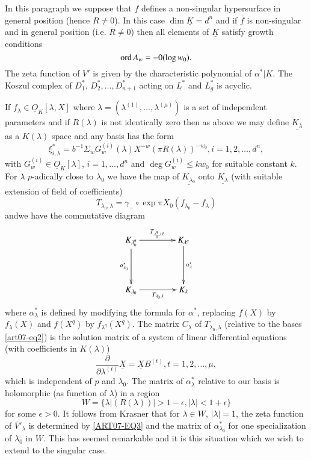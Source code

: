 In this paragraph we suppose that $f$ defines a non-singular hypersurface in general position (hence $R\neq 0$). In this case $\dim \underline{K}=d^{n}$ and if $\overline{f}$ is non-singular and in general position (i.e. $\overline{R}\neq 0$) then all elements of $\underline{K}$ satisfy growth conditions 
\begin{equation}
\operatorname{\mathrm{ord}} A_{w}=-0(\log w_{0}).\label{art07-eq1}
\end{equation}
The zeta function of $\overline{V'}$ is given by the characteristic polynomial of $\alpha^{*}|\underline{K}$. The Koszul complex of $D^{*}_{1}$, $D^{*}_{2},\ldots,D^{*}_{n+1}$ acting on $\underline{L^{*}}$ and $L^{*}_{g}$ is acyclic.

If $f_{\lambda}\in \underline{O}_{K}[\lambda,X]$ where $\lambda=(\lambda^{(1)},\ldots,\lambda^{(\mu)})$ is a set of independent parameters and if $R(\lambda)$ is not identically zero then as above we may define $\underline{K_{\lambda}}$ as a $K(\lambda)$ space and any basis has the form
\begin{equation}
\xi^{*}_{i,\lambda}=b^{-1}\Sigma_{w}G^{(i)}_{w}(\lambda)X^{-w}(\pi R(\lambda))^{-w_{0}}, i=1,2,\ldots,d^{n},\label{art07-eq2}
\end{equation}
with $G^{(i)}_{w}\in \underline{O}_{K}[\lambda]$, $i=1,\ldots,d^{n}$ and $\deg G^{(i)}_{w}\leq kw_{0}$ for suitable constant $k$. For $\lambda$ $p$-adically close to $\lambda_{0}$ we have the map of $\underline{K_{\lambda_{0}}}$ onto $\underline{K_{\lambda}}$ (with suitable extension of field of coefficients)
$$
T_{\lambda_{0},\lambda}=\gamma_{-}\circ \exp \pi X_{0}(f_{\lambda_{0}}-f_{\lambda})
$$
and\pageoriginale we have the commutative diagram
\[
\xymatrix@=1.5cm{
K_{\lambda^{q}_{0}}\ar[r]^-{T_{\lambda^{q}_{0},\lambda^{q}}}\ar[d]_-{\alpha^{*}_{\lambda_{0}}} & K_{\lambda^{q}}\ar[d]^-{\alpha^{*}_{\lambda}} \\
K_{\lambda_{0}}\ar[r]_-{T_{\lambda_{0},\lambda}} & K_{\lambda}
}
\]
where $\alpha^{*}_{\lambda}$ is defined by modifying the formula for $\alpha^{*}$, replacing $f(X)$ by $f_{\lambda}(X)$ and $f(X^{q})$ by $f_{\lambda^{q}}(X^{q})$. The matrix $C_{\lambda}$ of $T_{\lambda_{0},\lambda}$ (relative to the bases \eqref{art07-eq2}) is the solution matrix of a system of linear differential equations (with coefficients in $K(\lambda)$)
\begin{equation}
\dfrac{\partial}{\partial \lambda^{(t)}}\underline{X}=\underline{X}B^{(t)}, t=1,2,\ldots,\mu,\label{ART07-EQ3}
\end{equation}
which is independent of $p$ and $\lambda_{0}$. The matrix of $\alpha^{*}_{\lambda}$ relative to our basis is holomorphic (as function of $\lambda$) in a region
\begin{equation}
W=\{\lambda|(R(\lambda))|>1-\epsilon, |\lambda|<1+\epsilon\}\label{art07-eq4}
\end{equation}
for some $\epsilon>0$. It follows from Krasner that for $\lambda\in W$, $|\lambda|=1$, the zeta function of $\overline{V}'_{\lambda}$ is determined by \eqref{ART07-EQ3} and the matrix of $\alpha^{*}_{\lambda_{0}}$ for one specialization of $\lambda_{0}$ in $W$. This has seemed remarkable and it is this situation which we wish to extend to the singular case.

